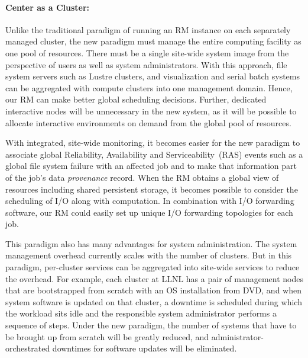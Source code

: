 \documentclass[10pt]{article}
\begin{document}
\paragraph{Center as a Cluster:}
Unlike the traditional paradigm of running an RM instance on each separately
managed cluster, 
the new paradigm must manage the
entire computing facility as one pool of resources. There must be a single site-wide 
system image from the perspective of users as well as system administrators.
With this approach, file system servers such as Lustre clusters, 
and visualization and serial batch systems can be aggregated
with compute clusters into one management domain. Hence,
our RM can make better global scheduling decisions. 
Further, dedicated interactive nodes will be unnecessary in the new system, as it
will be possible to allocate interactive environments on demand from the
global pool of resources.

With integrated, site-wide monitoring, it becomes easier
for the new paradigm to associate global Reliability, Availability and Serviceability~(RAS) 
events such as a global file system
failure with an affected job and to make that information part of
the job's data {\em provenance} record. When the RM obtains a global view of
resources including shared persistent storage, it becomes possible to
consider the scheduling of I/O along with computation. In combination with
I/O forwarding software, our RM could easily set up unique I/O forwarding
topologies for each job.

This paradigm also has many advantages for system administration.
The system management overhead currently scales with the number of clusters.
But in this paradigm, per-cluster services can be aggregated into
site-wide services to reduce the overhead.
For example, each cluster at LLNL has a pair of management
nodes that are bootstrapped from scratch with an OS installation from DVD,
and when system software is updated on that cluster, a downtime is
scheduled during which the workload sits idle and the responsible system
administrator performs a sequence of steps. Under the new paradigm, the
number of systems that have to be brought up from scratch will be
greatly reduced, and administrator-orchestrated downtimes for software
updates will be eliminated. 
\end{document}

